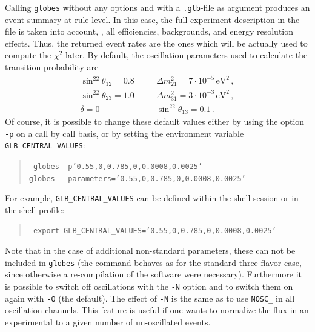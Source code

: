 Calling {\tt globes} without any options and with a {\tt .glb}-file as argument produces an event summary at rule level. In this case,  
the full experiment description in the file is taken into account, \ie, all efficiencies, backgrounds, and energy resolution effects. 
Thus, the returned event rates are the ones which will be actually 
used to compute the $\chi^2$ later. By default, the oscillation parameters used to calculate the transition probability are
\begin{eqnarray}
\label{eq:globes_params}
\sin^22\theta_{12}=0.8&\quad&\Delta m^2_{21}=7\cdot10^{-5}
\,\mathrm{eV}^2\,,\nonumber\\
\sin^22\theta_{23}=1.0&\quad&\Delta m^2_{31}=3\cdot10^{-3}
\,\mathrm{eV}^2\,,\nonumber\\
\delta=0&\quad&\sin^22\theta_{13}=0.1\,.\
\end{eqnarray}
Of course, it is possible to change these default values either by using the
option {\tt -p} on a call by call basis, or by setting the environment variable
{\tt GLB\_CENTRAL\_VALUES}:
%
%
\begin{quote}
{\tt
globes -p'0.55,0,0.785,0,0.0008,0.0025'\\
globes \verb+--+parameters='0.55,0,0.785,0,0.0008,0.0025'
}
\end{quote}
For example, {\tt GLB\_CENTRAL\_VALUES} can be defined
within the shell session or in the shell profile:
\begin{quote}
{\tt
export GLB\_CENTRAL\_VALUES='0.55,0,0.785,0,0.0008,0.0025'
}
\end{quote}
Note that in the case of additional non-standard parameters, these can not be included in {\tt globes}
(the command behaves as for the standard three-flavor case, since otherwise a re-compilation of the software
were necessary).
Furthermore it is possible to switch off oscillations with the {\tt -N} option and to switch them on again with {\tt -O} (the default). The effect of {\tt -N} is the same as to use {\tt NOSC\_} in all oscillation channels.
This feature is useful if one wants to normalize the flux in an experimental to
a given number of un-oscillated events.


